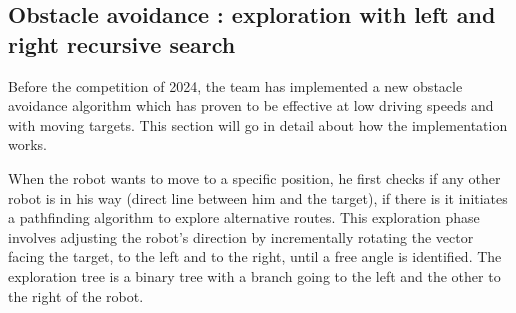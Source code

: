 \subsection{Obstacle avoidance : exploration with left and right recursive search}
Before the competition of 2024, the team has implemented a new obstacle avoidance algorithm which has
proven to be effective at low driving speeds and with moving targets. This section will go in detail about how the implementation works.

When the robot wants to move to a specific position, he first checks if any other robot is in his way (direct line between him and the target), if there is it initiates a pathfinding algorithm to explore alternative routes. This exploration phase involves adjusting the robot's direction by incrementally rotating the vector facing the target, to the left and to the right, until a free angle is identified. The exploration tree is a binary tree with a branch going to the left and the other to the right of the robot.

